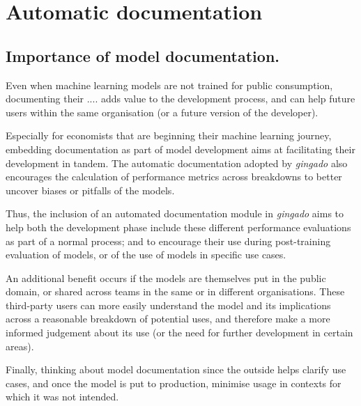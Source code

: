 \documentclass{article}
\begin{document}



\section{Automatic documentation}\label{documentation}
\subsection{Importance of model documentation.}

Even when machine learning models are not trained for public consumption, documenting their .... adds value to the development process, and can help future users within the same organisation (or a future version of the developer).

Especially for economists that are beginning their machine learning journey, embedding documentation as part of model development aims at facilitating their development in tandem. The automatic documentation adopted by \textit{gingado} also encourages the calculation of performance metrics across breakdowns to better uncover biases or pitfalls of the models.

Thus, the inclusion of an automated documentation module in \textit{gingado} aims to help both the development phase include these different performance evaluations as part of a normal process; and to encourage their use during post-training evaluation of models, or of the use of models in specific use cases.

An additional benefit occurs if the models are themselves put in the public domain, or shared across teams in the same or in different organisations. These third-party users can more easily understand the model and its implications across a reasonable breakdown of potential uses, and therefore make a more informed judgement about its use (or the need for further development in certain areas).

Finally, thinking about model documentation since the outside helps clarify use cases, and once the model is put to production, minimise usage in contexts for which it was not intended.
\end{document}
